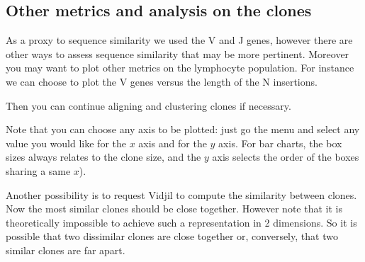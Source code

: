 \documentclass[10pt]{article}
\begin{document}



\subsection{Other metrics and analysis on the clones}

As a proxy to sequence similarity we used the V and J genes, however there are
other ways to assess sequence similarity that may be more pertinent.
Moreover you may want to plot other metrics on the lymphocyte population.
%
For instance we can choose to plot the V genes versus the length of the N
insertions.

Then you can continue aligning and clustering clones if necessary.


Note that you can choose any axis to be plotted: just go the  menu and
select any value you would like for the $x$ axis and for the $y$ axis.
For bar charts, the box sizes always relates to the clone size,
and the $y$ axis selects the order of the boxes sharing a same $x$).



Another possibility is to request Vidjil to compute the similarity between
clones.
Now the most similar clones should be close together. However note that it is
theoretically impossible to achieve such a representation in 2 dimensions. So
it is possible that two dissimilar clones are close together or, conversely,
that two similar clones are far apart.
\end{document}
